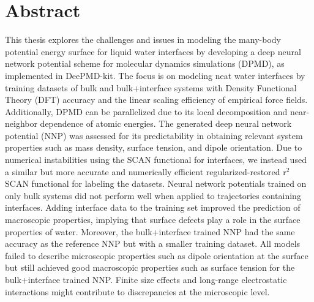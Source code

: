 \chapter*{Abstract}

This thesis explores the challenges and issues in modeling the many-body potential energy surface for liquid water interfaces by developing a deep neural network potential scheme for molecular dynamics simulations (DPMD), as implemented in DeePMD-kit. The focus is on modeling neat water interfaces by training datasets of bulk and bulk+interface systems with Density Functional Theory (DFT) accuracy and the linear scaling efficiency of empirical force fields. Additionally, DPMD can be parallelized due to its local decomposition and near-neighbor dependence of atomic energies. The generated deep neural network potential (NNP) was assessed for its predictability in obtaining relevant system properties such as mass density, surface tension, and dipole orientation. Due to numerical instabilities using the SCAN functional for interfaces, we instead used a similar but more accurate and numerically efficient regularized-restored r$^2$SCAN functional for labeling the datasets. Neural network potentials trained on only bulk systems did not perform well when applied to trajectories containing interfaces. Adding interface data to the training set improved the prediction of macroscopic properties, implying that surface defects play a role in the surface properties of water. Moreover, the bulk+interface trained NNP had the same accuracy as the reference NNP but with a smaller training dataset. All models failed to describe microscopic properties such as dipole orientation at the surface but still achieved good macroscopic properties such as surface tension for the bulk+interface trained NNP. Finite size effects and long-range electrostatic interactions might contribute to discrepancies at the microscopic level.